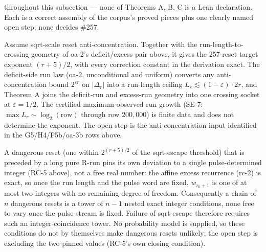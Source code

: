 throughout this subsection — none of Theorems A, B, C is a Lean declaration. Each is a
correct assembly of the corpus's proved pieces plus one clearly named open step; none decides
\#257.

\begin{thm}
Assume sqrt-scale reset anti-concentration. Together with the run-length-to-crossing geometry of
oa-2's deficit/excess pair above, it gives the 257-reset target exponent $(r+5)/2$, with every
correction constant in the derivation exact. The deficit-side run law (oa-2, unconditional and
uniform) converts any anti-concentration bound $2^{\varepsilon r}$ on $|\Delta_r|$ into a
run-length ceiling $L_r \lesssim (1-\varepsilon)\cdot 2r$, and Theorem A joins the deficit-run and
excess-run geometry into one crossing socket at $\varepsilon=1/2$. The certified maximum observed
run growth (SE-7: $\max L_r \sim \log_2(\mathrm{row})$ through row $200{,}000$) is finite data and
does not determine the exponent. The open step is the anti-concentration input identified in the
G5/H4/F5b/oa-3b rows above.
\end{thm}

\begin{thm}
A dangerous reset (one within $2^{(r+5)/2}$ of the sqrt-escape threshold) that is preceded by a
long pure R-run pins its own deviation to a single pulse-determined integer (RC-5 above), not a
free real number: the affine excess recurrence (rc-2) is exact, so once the run length and the
pulse word are fixed, $w_{r_0+1}$ is one of at most two integers with no remaining degree of
freedom. Consequently a chain of $n$ dangerous resets is a tower of $n{-}1$ nested exact integer
conditions, none free to vary once the pulse stream is fixed. Failure of sqrt-escape therefore
requires such an integer-coincidence tower. No probability model is supplied, so these conditions
do not by themselves make dangerous resets unlikely; the open step is excluding the two pinned
values (RC-5's own closing condition).
\end{thm}

